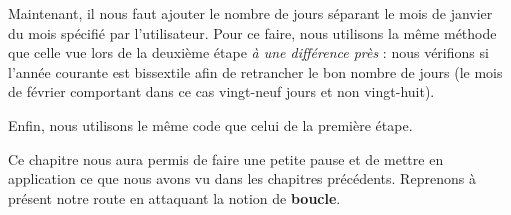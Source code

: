 Maintenant, il nous faut ajouter le nombre de jours séparant le mois de
janvier du mois spécifié par l'utilisateur. Pour ce faire, nous
utilisons la même méthode que celle vue lors de la deuxième étape
\emph{à une différence près} : nous vérifions si l'année courante est
bissextile afin de retrancher le bon nombre de jours (le mois de février
comportant dans ce cas vingt-neuf jours et non vingt-huit).

Enfin, nous utilisons le même code que celui de la première étape.



\hrulefill

Ce chapitre nous aura permis de faire une petite pause et de mettre en application ce que nous
avons vu dans les chapitres précédents. Reprenons à présent notre route
en attaquant la notion de \textbf{boucle}.